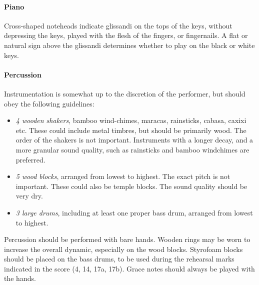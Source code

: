 \documentclass[11pt]{report}
\begin{document}
\begin{titlepage}
\begin{multicols}{3}
{    \paragraph{Piano}

    Cross-shaped noteheads indicate glissandi on the tops of the keys, without
    depressing the keys, played with the flesh of the fingers, or fingernails.
    A flat or natural sign above the glissandi determines whether to play on
    the black or white keys.

    \paragraph{Percussion}
    
    Instrumentation is somewhat up to the discretion of the performer, but
    should obey the following guidelines:

    \begin{itemize}
        
        \item \emph{4 wooden shakers}, bamboo wind-chimes, maracas, rainsticks,
        cabasa, caxixi etc. These could include metal timbres, but should be
        primarily wood. The order of the shakers is not important.  Instruments
        with a longer decay, and a more granular sound quality, such as
        rainsticks and bamboo windchimes are preferred.

        \item \emph{5 wood blocks}, arranged from lowest to highest.  The
        exact pitch is not important. These could also be temple blocks. The
        sound quality should be very dry.

        \item \emph{3 large drums}, including at least one proper bass drum,
        arranged from lowest to highest.

    \end{itemize}

    Percussion should be performed with bare hands. Wooden rings may be worn to
    increase the overall dynamic, especially on the wood blocks. Styrofoam
    blocks should be placed on the bass drums, to be used during the rehearsal
    marks indicated in the score (4, 14, 17a, 17b). Grace notes should always
    be played with the hands.
    
}

\end{multicols}
\end{titlepage}
\end{document}
